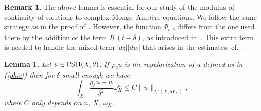 \documentclass[a4paper,11pt]{amsart}
\numberwithin{equation}{section}
\newtheorem{lemma}[theorem]{Lemma}
\theoremstyle{definition}
\newtheorem{remark}[theorem]{Remark}
\newcommand{\PSH}{{\rm PSH}}
\begin{document}
\begin{remark}
   The above lemma is essential for our study of the modulus of continuity of solutions to complex Monge--Ampère equations. We follow the same strategy as in the proof of~\cite[Theorem D]{demailly2014holder}. 
    However, the function $\Phi_{c,\delta}$ differs from the one used there by the addition of the term $K(t - \delta)$, as introduced in~\cite[Remark 4.7]{demailly1994regularization}. This extra term is needed to handle the mixed term $|dz||dw|$ that arises in the estimates; cf.~\cite{kolodziej2019stability}.
\end{remark}
\begin{lemma}\label{Jen}
 Let $u\in\PSH(X,\theta)$.
 If
	$\rho_{\delta} u$ is the regularization of
	$u$ defined as in (\ref{phie}) then for $\delta$ small enough we have
	$$
	\int_{X} \frac{\rho_{\delta} u-u}{\delta ^2 }\omega_X^n \leq C\|u\|_{L^1(X,dV_X)} ,
	$$
	where $C$ only depends on $n$, $X$, $\omega_X$.
\end{lemma}
\end{document}
